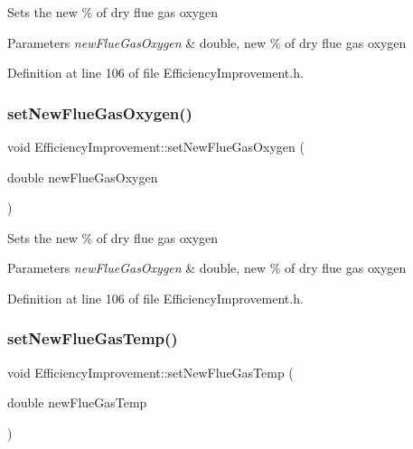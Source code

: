 Sets the new \% of dry flue gas oxygen


\begin{DoxyParams}{Parameters}
{\em new\+Flue\+Gas\+Oxygen} & double, new \% of dry flue gas oxygen \\
\hline
\end{DoxyParams}


Definition at line 106 of file Efficiency\+Improvement.\+h.

\mbox{\label{class_efficiency_improvement_a111f7e30d302b4e71103a2ec6d199e2c}} 
\subsubsection{\texorpdfstring{set\+New\+Flue\+Gas\+Oxygen()}{setNewFlueGasOxygen()}\hspace{0.1cm}{\footnotesize\ttfamily [3/3]}}
{\footnotesize\ttfamily void Efficiency\+Improvement\+::set\+New\+Flue\+Gas\+Oxygen (\begin{DoxyParamCaption}\item[{double}]{new\+Flue\+Gas\+Oxygen }\end{DoxyParamCaption})\hspace{0.3cm}{\ttfamily [inline]}}

Sets the new \% of dry flue gas oxygen


\begin{DoxyParams}{Parameters}
{\em new\+Flue\+Gas\+Oxygen} & double, new \% of dry flue gas oxygen \\
\hline
\end{DoxyParams}


Definition at line 106 of file Efficiency\+Improvement.\+h.

\mbox{\label{class_efficiency_improvement_ab88d3976fca8f55bb1fd3278bc427fc1}} 
\subsubsection{\texorpdfstring{set\+New\+Flue\+Gas\+Temp()}{setNewFlueGasTemp()}\hspace{0.1cm}{\footnotesize\ttfamily [1/3]}}
{\footnotesize\ttfamily void Efficiency\+Improvement\+::set\+New\+Flue\+Gas\+Temp (\begin{DoxyParamCaption}\item[{double}]{new\+Flue\+Gas\+Temp }\end{DoxyParamCaption})\hspace{0.3cm}{\ttfamily [inline]}}

